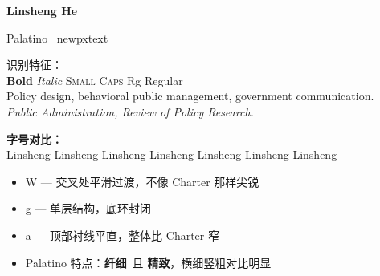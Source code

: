 \documentclass[11pt, a4paper]{article}
\begin{document}
{\fontsize{24pt}{30pt}\selectfont\bfseries Linsheng He}

\vspace{6pt}
{\LARGE Palatino \textbullet\ newpxtext}

\vspace{12pt}
{\footnotesize 识别特征：}\\[2pt]
{\large \textbf{Bold} \textit{Italic} \textsc{Small Caps} Rg Regular}\\[4pt]
{\large Policy design, behavioral public management, government communication.}\\[4pt]
{\large\itshape Public Administration, Review of Policy Research.}

\vspace{16pt}
{\footnotesize\bfseries 字号对比：}\\[2pt]
{\tiny Linsheng} {\scriptsize Linsheng} {\footnotesize Linsheng} {\small Linsheng}
Linsheng {\large Linsheng} {\Large Linsheng}

\vspace{12pt}
\begin{itemize}
    \item W --- 交叉处平滑过渡，不像 Charter 那样尖锐
    \item g --- 单层结构，底环封闭
    \item a --- 顶部衬线平直，整体比 Charter 窄
    \item Palatino 特点：\textbf{纤细}\ 且 \textbf{精致}，横细竖粗对比明显
\end{itemize}
\end{document}
